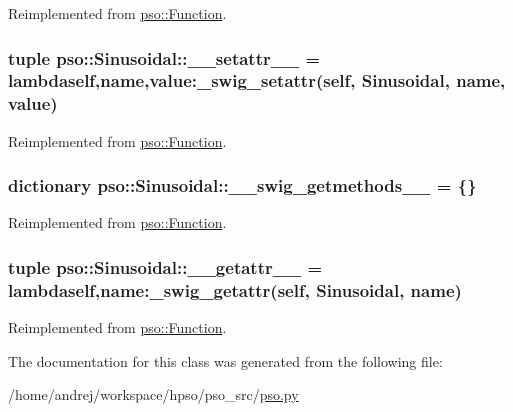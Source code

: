 Reimplemented from \hyperlink{classpso_1_1Function_2334bfe507115d58047f67960dde71d3}{pso::Function}.\hypertarget{classpso_1_1Sinusoidal_102c00e25a425a175159522a597af525}{
\subsubsection{\setlength{\rightskip}{0pt plus 5cm}tuple {\bf pso::Sinusoidal::\_\-\_\-setattr\_\-\_\-} = lambdaself,name,value:\_\-swig\_\-setattr(self, {\bf Sinusoidal}, name, value)}}
\label{classpso_1_1Sinusoidal_102c00e25a425a175159522a597af525}




Reimplemented from \hyperlink{classpso_1_1Function_cd8775cf6aadc3fdf4e6d82158ef10fb}{pso::Function}.\hypertarget{classpso_1_1Sinusoidal_1e801bb9b7015ee3d86b76df94f2c0a2}{
\subsubsection{\setlength{\rightskip}{0pt plus 5cm}dictionary {\bf pso::Sinusoidal::\_\-\_\-swig\_\-getmethods\_\-\_\-} = \{\}}}
\label{classpso_1_1Sinusoidal_1e801bb9b7015ee3d86b76df94f2c0a2}




Reimplemented from \hyperlink{classpso_1_1Function_5bddc07dbaab0ee579488bdcc8103a71}{pso::Function}.\hypertarget{classpso_1_1Sinusoidal_99c459f3188801b7e31f13b19af7cd33}{
\subsubsection{\setlength{\rightskip}{0pt plus 5cm}tuple {\bf pso::Sinusoidal::\_\-\_\-getattr\_\-\_\-} = lambdaself,name:\_\-swig\_\-getattr(self, {\bf Sinusoidal}, name)}}
\label{classpso_1_1Sinusoidal_99c459f3188801b7e31f13b19af7cd33}




Reimplemented from \hyperlink{classpso_1_1Function_affeed856b337656e88895fa35321496}{pso::Function}.

The documentation for this class was generated from the following file:\begin{CompactItemize}
\item 
/home/andrej/workspace/hpso/pso\_\-src/\hyperlink{pso_8py}{pso.py}\end{CompactItemize}
